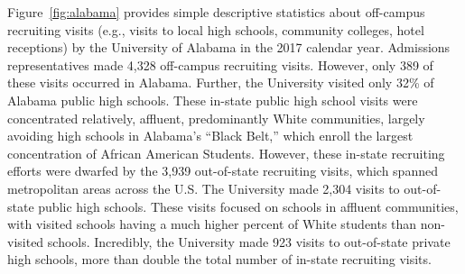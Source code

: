 \documentclass[twoside]{article}
\begin{document}
Figure~\ref{fig:alabama} provides simple descriptive statistics about off-campus recruiting visits (e.g., visits to local high schools, community colleges, hotel receptions) by the University of Alabama in the 2017 calendar year.  Admissions representatives made 4,328 off-campus recruiting visits.  However, only 389 of these visits occurred in Alabama.  Further, the University visited only 32\% of Alabama public high schools. These in-state public high school visits were concentrated relatively, affluent, predominantly White communities, largely avoiding high schools in Alabama's ``Black Belt,'' which enroll the largest concentration of African American Students.  However, these in-state recruiting efforts were dwarfed by the 3,939 out-of-state recruiting visits, which spanned metropolitan areas across the U.S. The University made 2,304 visits to out-of-state public high schools. These visits focused on schools in affluent communities, with visited schools having a much higher percent of White students than non-visited schools.  Incredibly, the University made 923 visits to out-of-state private high schools, more than double the total number of in-state recruiting visits.

\end{document}
